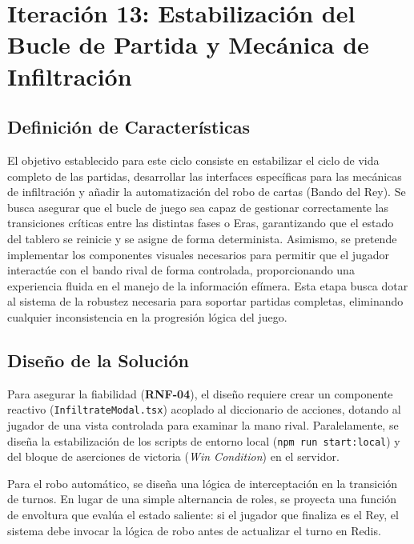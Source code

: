 \chapter[Iteración 13: Bucle de Partida e Infiltración]{Iteración 13: Estabilización del Bucle de Partida y Mecánica de Infiltración}

\section{Definición de Características}
El objetivo establecido para este ciclo consiste en estabilizar el ciclo de vida completo de las partidas, desarrollar las interfaces específicas para las mecánicas de infiltración y añadir la automatización del robo de cartas (Bando del Rey). Se busca asegurar que el bucle de juego sea capaz de gestionar correctamente las transiciones críticas entre las distintas fases o Eras, garantizando que el estado del tablero se reinicie y se asigne de forma determinista. Asimismo, se pretende implementar los componentes visuales necesarios para permitir que el jugador interactúe con el bando rival de forma controlada, proporcionando una experiencia fluida en el manejo de la información efímera. Esta etapa busca dotar al sistema de la robustez necesaria para soportar partidas completas, eliminando cualquier inconsistencia en la progresión lógica del juego.

\section{Diseño de la Solución}
Para asegurar la fiabilidad (\textbf{RNF-04}), el diseño requiere crear un componente reactivo (\texttt{InfiltrateModal.tsx}) acoplado al diccionario de acciones, dotando al jugador de una vista controlada para examinar la mano rival. Paralelamente, se diseña la estabilización de los scripts de entorno local (\texttt{npm run start:local}) y del bloque de aserciones de victoria (\textit{Win Condition}) en el servidor.

Para el robo automático, se diseña una lógica de interceptación en la transición de turnos. En lugar de una simple alternancia de roles, se proyecta una función de envoltura que evalúa el estado saliente: si el jugador que finaliza es el Rey, el sistema debe invocar la lógica de robo antes de actualizar el turno en Redis.

